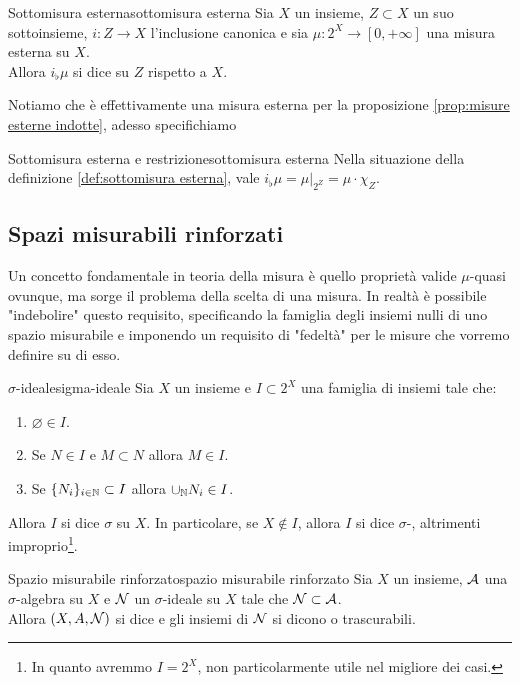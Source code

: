 \documentclass{article}
\renewcommand\A{\mc{A}}
\begin{document}
\begin{definition}{Sottomisura esterna}{sottomisura esterna}
    Sia $X$ un insieme, $Z\subset X$ un suo sottoinsieme, $i:Z\to X$ l'inclusione canonica e sia $\mu : 2^X \to [0,+\infty]$ una misura esterna su $X$.\\
    Allora $i_\flat \mu$ si dice  su $Z$ rispetto a $X$.
\end{definition}

Notiamo che è effettivamente una misura esterna per la proposizione \ref{prop:misure esterne indotte}, adesso specifichiamo 

\begin{proposition}{Sottomisura esterna e restrizione}{sottomisura esterna}
    Nella situazione della definizione \ref{def:sottomisura esterna}, vale $i_\flat \mu = \mu|_{2^Z} = \mu \cdot \chi_Z$.
\end{proposition}

\subsection{Spazi misurabili rinforzati}

Un concetto fondamentale in teoria della misura è quello proprietà valide $\mu$-quasi ovunque, ma sorge il problema della scelta di una misura. In realtà è possibile "indebolire" questo requisito, specificando la famiglia degli insiemi nulli di uno spazio misurabile e imponendo un requisito di "fedeltà" per le misure che vorremo definire su di esso.

\begin{definition}{$\sigma$-ideale}{sigma-ideale}
    Sia $X$ un insieme e $I \subset 2^X$ una famiglia di insiemi tale che:\begin{enumerate}
        \item $\varnothing \in I$.
        \item Se $N \in I$ e $M\subset N$ allora $M \in I$.
        \item Se $\{N_i\}_{i \in \mathbb{N}}\subset I$ allora $\cup_{\mathbb{N}} N_i \in I$.
    \end{enumerate}
    Allora $I$ si dice $\sigma$ su $X$. In particolare, se $X \notin I$, allora $I$ si dice $\sigma$-, altrimenti improprio\footnote{In quanto avremmo $I=2^X$, non particolarmente utile nel migliore dei casi.}.
\end{definition}

\begin{definition}{Spazio misurabile rinforzato}{spazio misurabile rinforzato}
    Sia $X$ un insieme, $\A$ una $\sigma$-algebra su $X$ e $\mathcal{N}$ un $\sigma$-ideale su $X$ tale che $\mc{N}\subset \A$.\\
    Allora $(X,A,\mathcal{N})$ si dice  e gli insiemi di $\mathcal{N}$ si dicono  o trascurabili.
\end{definition}
\end{document}
